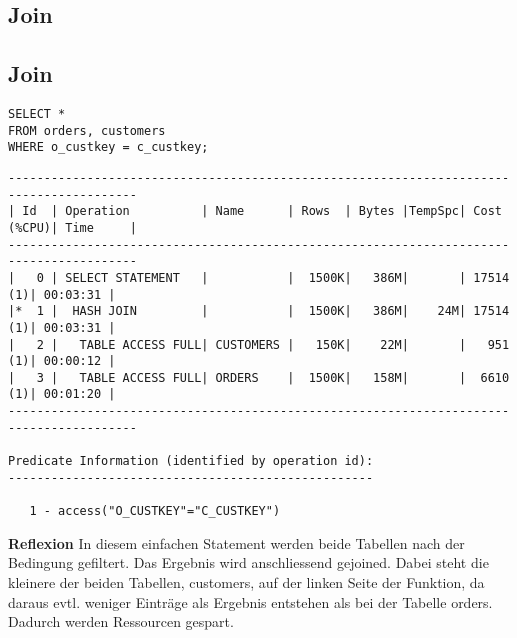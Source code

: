\documentclass[10pt]{article}
\begin{document}
\subsection{Join}
\subsection{Join}
\begin{lstlisting}[style=sql]
SELECT *
FROM orders, customers
WHERE o_custkey = c_custkey;
\end{lstlisting}
\begin{lstlisting}[style=queryexecutionplan]
----------------------------------------------------------------------------------------
| Id  | Operation          | Name      | Rows  | Bytes |TempSpc| Cost (%CPU)| Time     |
----------------------------------------------------------------------------------------
|   0 | SELECT STATEMENT   |           |  1500K|   386M|       | 17514   (1)| 00:03:31 |
|*  1 |  HASH JOIN         |           |  1500K|   386M|    24M| 17514   (1)| 00:03:31 |
|   2 |   TABLE ACCESS FULL| CUSTOMERS |   150K|    22M|       |   951   (1)| 00:00:12 |
|   3 |   TABLE ACCESS FULL| ORDERS    |  1500K|   158M|       |  6610   (1)| 00:01:20 |
----------------------------------------------------------------------------------------
 
Predicate Information (identified by operation id):
---------------------------------------------------
 
   1 - access("O_CUSTKEY"="C_CUSTKEY")
\end{lstlisting}
\textbf{Reflexion} \newline
In diesem einfachen Statement werden beide Tabellen nach der Bedingung gefiltert.
Das Ergebnis wird anschliessend gejoined. Dabei steht die kleinere der beiden Tabellen, customers, auf der linken Seite der Funktion, da daraus evtl. weniger Einträge als Ergebnis entstehen als bei der Tabelle orders. Dadurch werden Ressourcen gespart.
\end{document}
